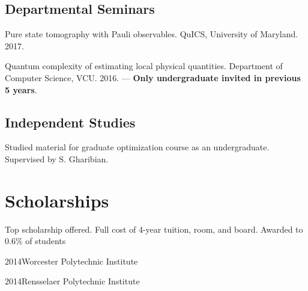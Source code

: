 \documentclass[11pt,letterpaper,serif]{moderncv}
\begin{document}
\subsection{Departmental Seminars}
{ \leftskip 0.2in \parindent -0.2in %
	
Pure state tomography with Pauli observables. QuICS, University of Maryland. 2017.

Quantum complexity of estimating local physical quantities. Department of Computer Science, VCU. 2016. --- \textbf{Only undergraduate invited in previous 5 years}.

}


\subsection{Independent Studies}
{
	\begin{adjustwidth}{.25in}{}
		Studied material for graduate optimization course as an undergraduate. Supervised by S. Gharibian.
	\end{adjustwidth}
}


\section{Scholarships \hspace{2em}{\footnotesize (all dollar amounts in USD)}} 
{	
\begin{adjustwidth}{.25in}{}
	Top scholarship offered. Full cost of 4-year tuition, room, and board. \newline
	Awarded to 0.6\% of students
\end{adjustwidth}
}

 {2014}{Worcester Polytechnic Institute}{}

 {2014}{Rensselaer Polytechnic Institute}{}

\end{document}
